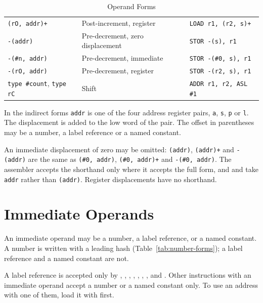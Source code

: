 \begin{table}[H]
\begin{tabular}{lll}
		\texttt{(rO, addr)+}                           & Post-increment, register          & \texttt{LOAD r1, (r2, s)+}    \\
		\texttt{-(addr)}                               & Pre-decrement, zero displacement  & \texttt{STOR -(s), r1}        \\
		\texttt{-(\#n, addr)}                          & Pre-decrement, immediate          & \texttt{STOR -(\#0, s), r1}   \\
		\texttt{-(rO, addr)}                           & Pre-decrement, register           & \texttt{STOR -(r2, s), r1}    \\
		\texttt{type \#count}, \texttt{type rC}        & Shift                             & \texttt{ADDR r1, r2, ASL \#1} \\
		\bottomrule
	\end{tabular}
	\caption{Operand Forms}
	\label{tab:operand-forms}
\end{table}

In the indirect forms \texttt{addr} is one of the four address register pairs, \texttt{a}, \texttt{s}, \texttt{p} or
\texttt{l}. The displacement is added to the low word of the pair. The offset in parentheses may be a number, a label
reference or a named constant.

An immediate displacement of zero may be omitted: \texttt{(addr)}, \texttt{(addr)+} and \texttt{-(addr)} are the same
as \texttt{(\#0, addr)}, \texttt{(\#0, addr)+} and \texttt{-(\#0, addr)}. The assembler accepts the shorthand only
where it accepts the full form, and  and  take \texttt{addr} rather than \texttt{(addr)}.
Register displacements have no shorthand.

\section{Immediate Operands}

An immediate operand may be a number, a label reference, or a named constant. A number is written with a leading hash
(Table~\ref{tab:number-forms}); a label reference and a named constant are not.

A label reference is accepted only by , , , ,
, , ,  and . Other instructions with an
immediate operand accept a number or a named constant only. To use an address with one of them, load it with
 first.

